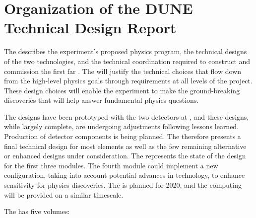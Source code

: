\section{Organization of the DUNE Technical Design Report}

The   describes the experiment's proposed physics program, the 
technical designs of the two   technologies, and the technical coordination required to construct and commission the first far .
The  will 
justify the technical choices that flow down from the high-level physics goals through requirements at all levels of the project. These design choices will enable the  experiment to make the ground-breaking discoveries that will help answer 
fundamental physics questions. 

The   designs have been prototyped with the two  detectors at , and these designs, while largely complete, are undergoing adjustments following lessons learned. Production of detector components is being planned. 
The   therefore presents a final technical design for most elements as well as the few remaining alternative or enhanced designs under consideration. The  represents the state of the design for the first three   modules.
The fourth module could implement a new  configuration, taking into account  potential advances in technology, to enhance sensitivity for physics discoveries. 
 The   is planned for 2020, and the computing  will be provided on a similar timescale.

The    has five volumes:

